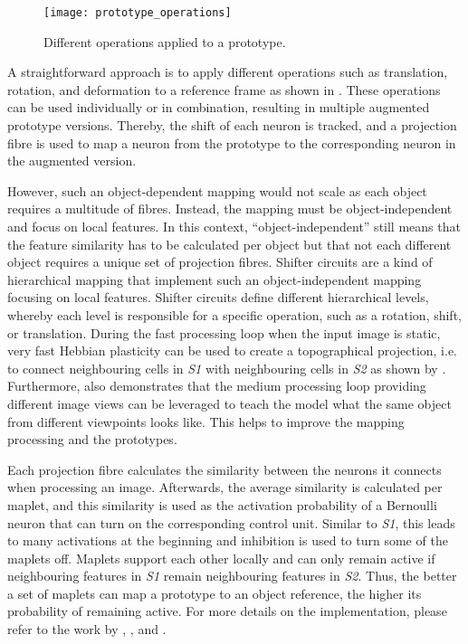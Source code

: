\begin{figure}[h]
    \centering
    \texttt{[image: prototype\_operations]}
    \caption[Operations applied to a prototype]{Different operations applied to a prototype.}
\end{figure}
A straightforward approach is to apply different operations such as translation, rotation, and deformation to a reference frame as shown in . These operations can be used individually or in combination, resulting in multiple augmented prototype versions.
Thereby, the shift of each neuron is tracked, and a projection fibre is used to map a neuron from the prototype to the corresponding neuron in the augmented version.

However, such an object-dependent mapping would not scale as each object requires a multitude of fibres.
Instead, the mapping must be object-independent and focus on local features.
In this context, ``object-independent'' still means that the feature similarity has to be calculated per object but that not each different object requires a unique set of projection fibres.
Shifter circuits  are a kind of hierarchical mapping that implement such an object-independent mapping focusing on local features.
Shifter circuits define different hierarchical levels, whereby each level is responsible for a specific operation, such as a rotation, shift, or translation.
During the fast processing loop when the input image is static, very fast Hebbian plasticity  can be used to create a topographical projection, i.e. to connect neighbouring cells in \emph{S1} with neighbouring cells in \emph{S2} as shown by .
Furthermore,  also demonstrates that the medium processing loop providing different image views can be leveraged to teach the model what the same object from different viewpoints looks like.
This helps to improve the mapping processing and the prototypes.

Each projection fibre calculates the similarity between the neurons it connects when processing an image.
Afterwards, the average similarity is calculated per maplet, and this similarity is used as the activation probability of a Bernoulli neuron that can turn on the corresponding control unit.
Similar to \emph{S1}, this leads to many activations at the beginning and inhibition is used to turn some of the maplets off.
Maplets support each other locally and can only remain active if neighbouring features in \emph{S1} remain neighbouring features in \emph{S2}.
Thus, the better a set of maplets can map a prototype to an object reference, the higher its probability of remaining active.
For more details on the implementation, please refer to the work by , , and .


